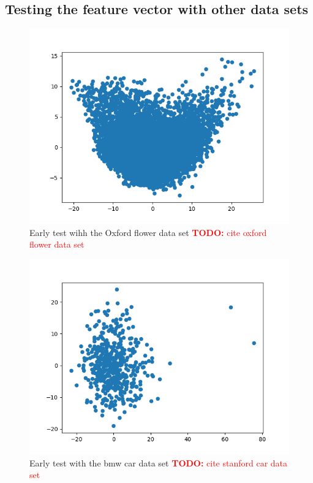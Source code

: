 \documentclass[journal]{vgtc}       %
\newcommand{\todo}[1]{\textcolor{red}{\textbf{TODO:} #1}}
\begin{document}
\subsection{Testing the feature vector with other data sets}
\begin{figure}[tb]
	\begin{center}
		\includegraphics[width=.75\linewidth]{Figure1.png}
	\end{center}
	\caption{\label{fig:lorem} Early test wihh the Oxford flower data set \todo{cite oxford flower data set}}
\end{figure} 
\begin{figure}[tb]
	\begin{center}
		\includegraphics[width=.75\linewidth]{Figure2.png}
	\end{center}
	\caption{\label{fig:bmw} Early test with the bmw car data set \todo{cite stanford car data set}\cite{stanfordcar}}
\end{figure}
\end{document}
